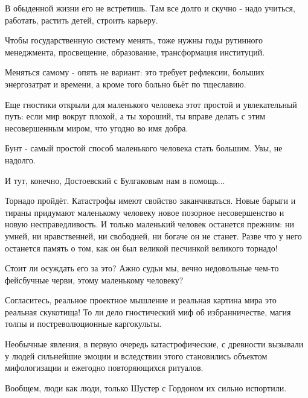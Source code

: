 В обыденной жизни его не встретишь. Там все долго и скучно - надо  учиться,
работать, растить детей,  строить карьеру.

Чтобы государственную систему менять, тоже нужны годы рутинного менеджмента,
просвещение, образование, трансформация институций.

Меняться самому -  опять не вариант: это требует рефлексии, больших
энергозатрат и времени, а кроме того больно бьёт по тщеславию.

Еще гностики открыли для маленького человека этот простой и увлекательный путь:
если мир вокруг плохой, а ты хороший, ты вправе делать с этим несовершенным
миром, что угодно во имя добра.

Бунт - самый простой способ маленького человека стать большим. Увы, не надолго.

И тут, конечно, Достоевский с Булгаковым нам в помощь...

Торнадо пройдёт. Катастрофы имеют свойство заканчиваться. Новые барыги и тираны
придумают маленькому человеку  новое позорное несовершенство и новую
несправедливость. И только маленький человек останется  прежним: ни умней, ни
нравственней, ни свободней, ни богаче он не станет. Разве что у него останется
память о том, как он был великой песчинкой великого торнадо!

Стоит ли осуждать его за это? Ажно судьи мы, вечно  недовольные чем-то
фейсбучные черви, этому маленькому человеку?

Согласитесь, реальное проектное мышление и реальная картина мира это реальная
скукотища! То ли дело гностический миф об избранничестве, магия толпы и
постреволюционные каргокульты.

Необычные явления, в первую очередь катастрофические, с древности вызывали у
людей сильнейшие эмоции и вследствии этого становились объектом мифологизации и
ежегодно повторяющихся ритуалов.

Вообщем, люди как люди, только Шустер с Гордоном их сильно испортили.

